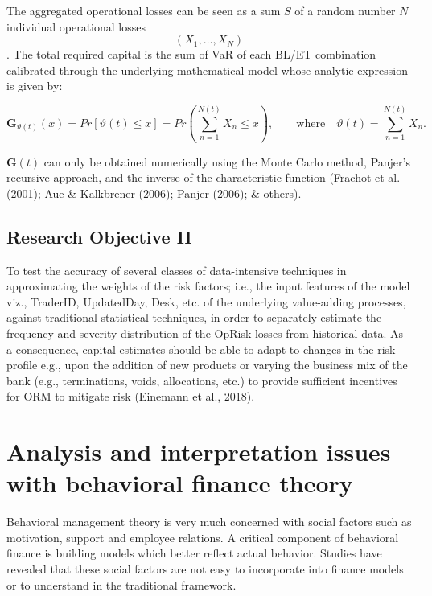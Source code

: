 \documentclass{DissertateUSU}
\begin{document}
The aggregated operational losses can be seen as a sum \(S\) of a random
number \(N\) individual operational losses \[(X_1, \ldots, X_N )\]. The
total required capital is the sum of VaR of each BL/ET combination
calibrated through the underlying mathematical model whose analytic
expression is given by:

\singlespacing

\begin{equation}\label{eqn4}
\mathbf{G}_{\vartheta(t)}(x)=Pr[\vartheta(t)\leq x]=Pr\left(\sum_{n=1}^{N(t)}X_{n} \leq x\right), \qquad \mbox{where} \quad \vartheta(t) = \sum_{n=1}^{N(t)} X_{n}.
\end{equation} \doublespacing

\(\mathbf{G}(t)\) can only be obtained numerically using the Monte Carlo
method, Panjer's recursive approach, and the inverse of the
characteristic function (Frachot et al. (2001); Aue \& Kalkbrener
(2006); Panjer (2006); \& others).

\subsection{Research Objective II}

To test the accuracy of several classes of data-intensive techniques in
approximating the weights of the risk factors; i.e., the input features
of the model viz., TraderID, UpdatedDay, Desk, etc. of the underlying
value-adding processes, against traditional statistical techniques, in
order to separately estimate the frequency and severity distribution of
the OpRisk losses from historical data. As a consequence, capital
estimates should be able to adapt to changes in the risk profile e.g.,
upon the addition of new products or varying the business mix of the
bank (e.g., terminations, voids, allocations, etc.) to provide
sufficient incentives for ORM to mitigate risk (Einemann et al., 2018).

\section{Analysis and interpretation issues with behavioral finance theory}
\label{sec:Analysis and interpretation issues with behavioral finance theory}

Behavioral management theory is very much concerned with social factors
such as motivation, support and employee relations. A critical component
of behavioral finance is building models which better reflect actual
behavior. Studies have revealed that these social factors are not easy
to incorporate into finance models or to understand in the traditional
framework.\medskip 
\end{document}
